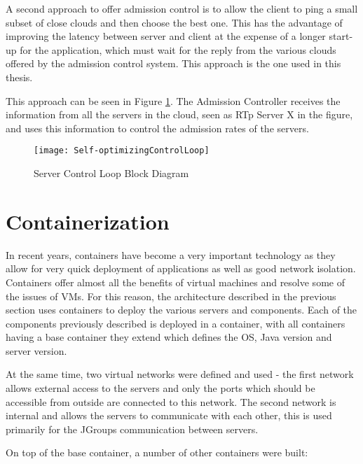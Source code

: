 A second approach to offer admission control is to allow the client to ping a small subset of close clouds and then choose the best one. This has the advantage of improving the latency between server and client at the expense of a longer start-up for the application, which must wait for the reply from the various clouds offered by the admission control system. This approach is the one used in this thesis.

This approach can be seen in Figure \ref{fig:servercontrolloop}. The Admission Controller receives the information from all the servers in the cloud, seen as RTp Server X in the figure, and uses this information to control the admission rates of the servers.

\begin{figure}
	\centering
		\texttt{[image: Self-optimizingControlLoop]}
	\caption{Server Control Loop Block Diagram}
	\label{fig:servercontrolloop}
\end{figure}

\section{Containerization}

In recent years, containers have become a very important technology as they allow for very quick deployment of applications as well as good network isolation. Containers offer almost all the benefits of virtual machines and resolve some of the issues of VMs. For this reason, the architecture described in the previous section uses containers to deploy the various servers and components. Each of the components previously described is deployed in a container, with all containers having a base container they extend which defines the OS, Java version and server version. 

At the same time, two virtual networks were defined and used - the first network allows external access to the servers and only the ports which should be accessible from outside are connected to this network. The second network is internal and allows the servers to communicate with each other, this is used primarily for the JGroups communication between servers.

On top of the base container, a number of other containers were built:

